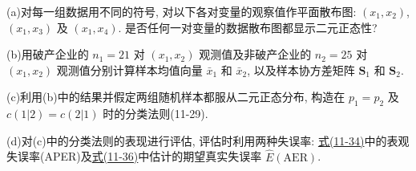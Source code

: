 

\noindent (a)\quad 对每一组数据用不同的符号, 对以下各对变量的观察值作平面散布图: $(x_1,x_2)$, $(x_1,x_3)$ 及 $(x_1,x_4)$. 是否任何一对变量的数据散布图都显示二元正态性?

\noindent (b)\quad 用破产企业的 $n_1=21$ 对 $(x_1,x_2)$ 观测值及非破产企业的 $n_2=25$ 对 $(x_1,x_2)$ 观测值分别计算样本均值向量 $\bar{x}_1$ 和 $\bar{x}_2$, 以及样本协方差矩阵 $\mathbf{S}_1$ 和 $\mathbf{S}_2$.

\noindent (c)\quad 利用(b)中的结果并假定两组随机样本都服从二元正态分布, 构造在 $p_1=p_2$ 及 $c(1|2)=c(2|1)$ 时的分类法则(11-29).

\noindent (d)\quad 对(c)中的分类法则的表现进行评估, 评估时利用两种失误率: \hyperref[eq:11-34]{式(11-34)}中的表观失误率(APER)及\hyperref[eq:11-36]{式(11-36)}中估计的期望真实失误率 $\hat{E}(\mathrm{AER})$.
